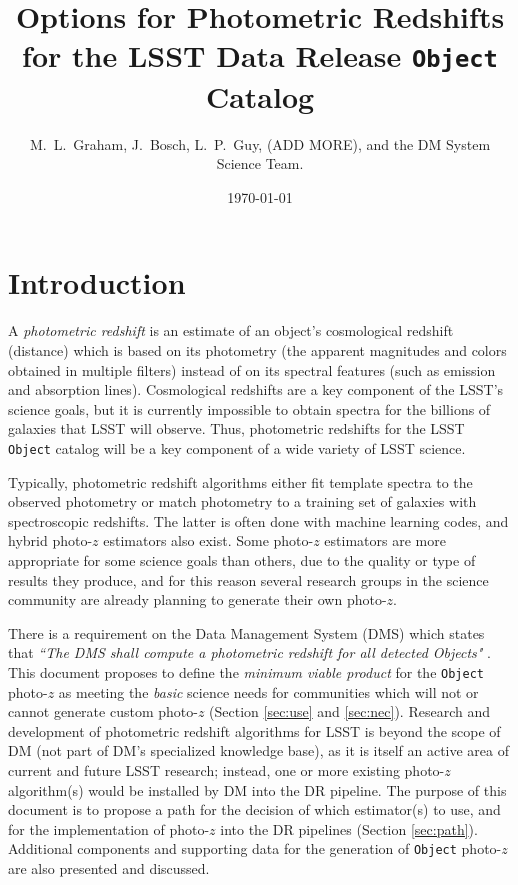 \documentclass[DM,lsstdraft,toc]{lsstdoc}
\title[Photo-$z$ for LSST Objects]{Options for Photometric Redshifts for the LSST Data Release {\tt Object} Catalog}
\author{M.~L.~Graham, J.~Bosch, L.~P.~Guy, (ADD MORE), and the DM System Science Team.}
\date{\today}
\begin{document}
\maketitle


\section{Introduction} \label{sec:intro}

A {\it photometric redshift} is an estimate of an object's cosmological redshift (distance) which is based on its photometry (the apparent magnitudes and colors obtained in multiple filters) instead of on its spectral features (such as emission and absorption lines). 
Cosmological redshifts are a key component of the LSST's science goals, but it is currently impossible to obtain spectra for the billions of galaxies that LSST will observe. 
Thus, photometric redshifts for the LSST {\tt Object} catalog will be a key component of a wide variety of LSST science. 

Typically, photometric redshift algorithms either fit template spectra to the observed photometry or match photometry to a training set of galaxies with spectroscopic redshifts. 
The latter is often done with machine learning codes, and hybrid photo-$z$ estimators also exist. 
Some photo-$z$ estimators are more appropriate for some science goals than others, due to the quality or type of results they produce, and for this reason several research groups in the science community are already planning to generate their own photo-$z$.

There is a requirement on the Data Management System (DMS) which states that {\it ``The DMS shall compute a photometric redshift for all detected Objects"} . 
This document proposes to define the {\it minimum viable product} for the {\tt Object} photo-$z$ as meeting the {\it basic} science needs for communities which will not or cannot generate custom photo-$z$ (Section \ref{sec:use} and \ref{sec:nec}).
Research and development of photometric redshift algorithms for LSST is beyond the scope of DM (not part of DM's specialized knowledge base), as it is itself an active area of current and future LSST research; instead, one or more existing photo-$z$ algorithm(s) would be installed by DM into the DR pipeline.
The purpose of this document is to propose a path for the decision of which estimator(s) to use, and for the implementation of photo-$z$ into the DR pipelines (Section \ref{sec:path}).
Additional components and supporting data for the generation of {\tt Object} photo-$z$ are also presented and discussed. 
\end{document}
